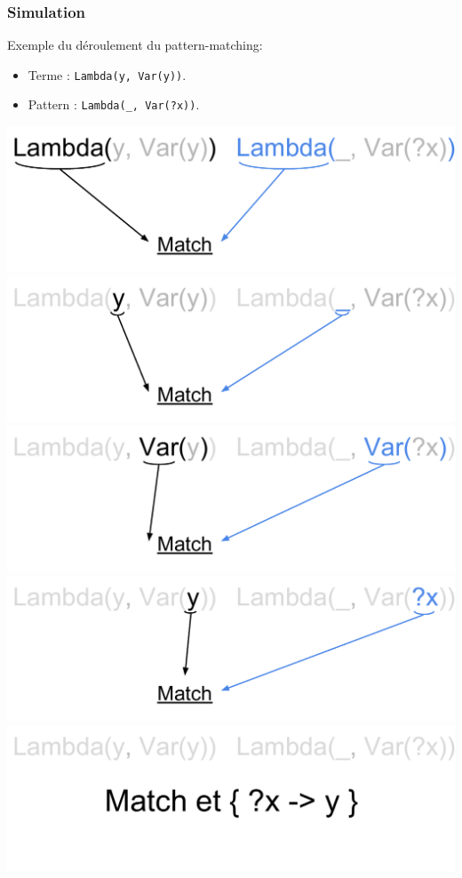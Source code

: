 \begin{frame}
\frametitle{Simulation}

Exemple du déroulement du pattern-matching:
\begin{itemize}
  
  \item Terme : \texttt{Lambda(y, Var(y))}.

  \item Pattern : \texttt{Lambda(\_, Var(?x))}.

\end{itemize}

\bigskip

\begin{center}
      {\includegraphics[scale=0.5]{pattern/trivial1.pdf}}
      {\includegraphics[scale=0.5]{pattern/trivial2.pdf}}
      {\includegraphics[scale=0.5]{pattern/trivial3.pdf}}
      {\includegraphics[scale=0.5]{pattern/trivial4.pdf}}
      {\includegraphics[scale=0.5]{pattern/trivial5.pdf}}


\end{center}
\end{frame}
